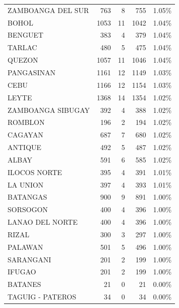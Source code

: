 \begin{tabular}{lrrrr}
ZAMBOANGA DEL SUR & 763 & 8 & 755 & 1.05\% \\
BOHOL & 1053 & 11 & 1042 & 1.04\% \\
BENGUET & 383 & 4 & 379 & 1.04\% \\
TARLAC & 480 & 5 & 475 & 1.04\% \\
QUEZON & 1057 & 11 & 1046 & 1.04\% \\
PANGASINAN & 1161 & 12 & 1149 & 1.03\% \\
CEBU & 1166 & 12 & 1154 & 1.03\% \\
LEYTE & 1368 & 14 & 1354 & 1.02\% \\
ZAMBOANGA SIBUGAY & 392 & 4 & 388 & 1.02\% \\
ROMBLON & 196 & 2 & 194 & 1.02\% \\
CAGAYAN & 687 & 7 & 680 & 1.02\% \\
ANTIQUE & 492 & 5 & 487 & 1.02\% \\
ALBAY & 591 & 6 & 585 & 1.02\% \\
ILOCOS NORTE & 395 & 4 & 391 & 1.01\% \\
LA UNION & 397 & 4 & 393 & 1.01\% \\
BATANGAS & 900 & 9 & 891 & 1.00\% \\
SORSOGON & 400 & 4 & 396 & 1.00\% \\
LANAO DEL NORTE & 400 & 4 & 396 & 1.00\% \\
RIZAL & 300 & 3 & 297 & 1.00\% \\
PALAWAN & 501 & 5 & 496 & 1.00\% \\
SARANGANI & 201 & 2 & 199 & 1.00\% \\
IFUGAO & 201 & 2 & 199 & 1.00\% \\
BATANES & 21 & 0 & 21 & 0.00\% \\
TAGUIG - PATEROS & 34 & 0 & 34 & 0.00\% \\
\bottomrule
\end{tabular}
